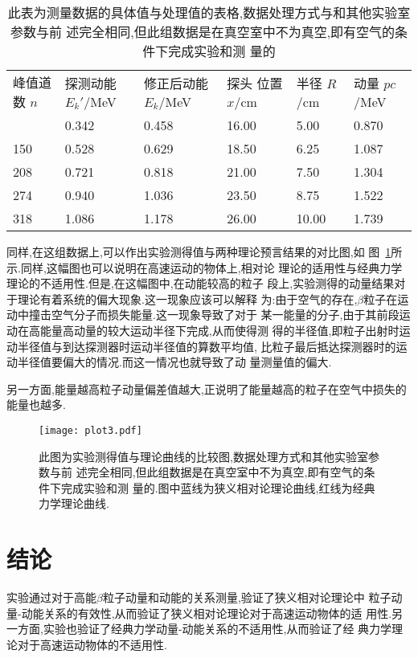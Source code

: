 \documentclass[aps,pre,12pt,preprint,onecolumn,showpacs,showkeys]{revtex4-1}
\begin{document}
\begin{table}[htbp]
  \caption{\label{tab:table2}%
此表为测量数据的具体值与处理值的表格,数据处理方式与和其他实验室参数与前
述完全相同,但此组数据是在真空室中不为真空,即有空气的条件下完成实验和测
量的}
\begin{ruledtabular}
  \begin{tabular}{llllll}
     峰值道数 $n$ & 探测动能 $E_k'$/MeV & 修正后动能  $E_k$/MeV & 探头
     位置 $x$/cm & 半径 $R$/cm & 动量 $pc$/MeV\\
     \colrule
94 & 0.342 & 0.458 & 16.00 & 5.00 & 0.870 \\
150 & 0.528 & 0.629 & 18.50 & 6.25 & 1.087 \\
208 & 0.721 & 0.818 & 21.00 & 7.50 & 1.304 \\
274 & 0.940 & 1.036 & 23.50 & 8.75 & 1.522 \\
318 & 1.086 & 1.178 & 26.00 & 10.00 & 1.739
   \end{tabular}
\end{ruledtabular}
\end{table}

同样,在这组数据上,可以作出实验测得值与两种理论预言结果的对比图,如
图~\ref{fig:plot3}所示.同样,这幅图也可以说明在高速运动的物体上,相对论
理论的适用性与经典力学理论的不适用性.但是,在这幅图中,在动能较高的粒子
段上,实验测得的动量结果对于理论有着系统的偏大现象.这一现象应该可以解释
为:由于空气的存在,$\beta$粒子在运动中撞击空气分子而损失能量.这一现象导致了对于
某一能量的分子,由于其前段运动在高能量高动量的较大运动半径下完成,从而使得测
得的半径值,即粒子出射时运动半径值与到达探测器时运动半径值的算数平均值,
比粒子最后抵达探测器时的运动半径值要偏大的情况.而这一情况也就导致了动
量测量值的偏大.

另一方面,能量越高粒子动量偏差值越大,正说明了能量越高的粒子在空气中损失的
能量也越多.

\begin{figure}[htbp]
  \centering
\texttt{[image: plot3.pdf]}
\caption{\label{fig:plot3}%
此图为实验测得值与理论曲线的比较图,数据处理方式和其他实验室参数与前
述完全相同,但此组数据是在真空室中不为真空,即有空气的条件下完成实验和测
量的.图中蓝线为狭义相对论理论曲线,红线为经典力学理论曲线.}
\end{figure}


\section{结论}

实验通过对于高能$\beta$粒子动量和动能的关系测量,验证了狭义相对论理论中
粒子动量-动能关系的有效性,从而验证了狭义相对论理论对于高速运动物体的适
用性.另一方面,实验也验证了经典力学动量-动能关系的不适用性,从而验证了经
典力学理论对于高速运动物体的不适用性.
\end{document}

